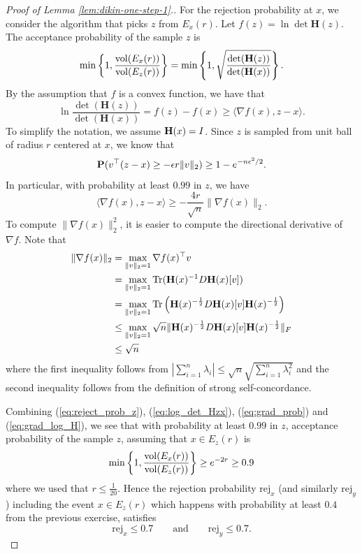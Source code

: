 \begin{proof}[Proof of Lemma \ref{lem:dikin-one-step-1}.]
For the rejection probability at $x$, we consider the algorithm that
picks $z$ from $E_{x}(r)$. Let $f(z)=\ln\det\mathbf{H}(z)$. The
acceptance probability of the sample $z$ is
\begin{equation}
\min\left\{ 1,\frac{\vol(E_{x}(r))}{\vol(E_{z}(r))}\right\} =\min\left\{ 1,\sqrt{\frac{\det(\mathbf{H}(z))}{\det(\mathbf{H}(x))}}\right\} .\label{eq:reject_prob_z}
\end{equation}
By the assumption that $f$ is a convex function, we have that
\begin{equation}
\ln\frac{\det(\mathbf{H}(z))}{\det(\mathbf{H}(x))}=f(z)-f(x)\geq\langle\nabla f(x),z-x\rangle.\label{eq:log_det_Hzx}
\end{equation}
To simplify the notation, we assume $\mh(x)=\mi$. Since $z$ is sampled
from unit ball of radius $r$ centered at $x$, we know that 
\[
\P(v^{\top}(z-x)\geq-\epsilon r\|v\|_{2})\geq1-e^{-n\epsilon^{2}/2}.
\]
In particular, with probability at least $0.99$ in $z$, we have
\begin{equation}
\langle\nabla f(x),z-x\rangle\geq-\frac{4r}{\sqrt{n}}\|\nabla f(x)\|_{2}.\label{eq:grad_prob}
\end{equation}
To compute $\|\nabla f(x)\|^{2}_{2}$, it is easier to compute the
directional derivative of $\nabla f$. Note that 
\begin{align}
\|\nabla f(x)\|_{2} & =\max_{\|v\|_{2}=1}\nabla f(x)^{\top}v\nonumber \\
 & =\max_{\|v\|_{2}=1}\tr(\mh(x)^{-1}D\mh(x)[v])\nonumber \\
 & =\max_{\|v\|_{2}=1}\tr\left(\mh(x)^{-\frac{1}{2}}D\mh(x)[v]\mh(x)^{-\frac{1}{2}}\right)\nonumber \\
 & \leq\max_{\|v\|_{2}=1}\sqrt{n}\|\mh(x)^{-\frac{1}{2}}D\mh(x)[v]\mh(x)^{-\frac{1}{2}}\|_{F}\nonumber \\
 & \leq\sqrt{n}\label{eq:grad_log_H}
\end{align}
where the first inequality follows from $\left|\sum^{n}_{i=1}\lambda_{i}\right|\leq\sqrt{n}\sqrt{\sum^{n}_{i=1}\lambda^{2}_{i}}$
and the second inequality follows from the definition of strong self-concordance.

Combining (\ref{eq:reject_prob_z}), (\ref{eq:log_det_Hzx}), (\ref{eq:grad_prob})
and (\ref{eq:grad_log_H}), we see that with probability at least
$0.99$ in $z$, acceptance probability of the sample $z$, assuming
that $x\in E_{z}(r)$ is 
\begin{equation}
\min\left\{ 1,\frac{\vol(E_{x}(r))}{\vol(E_{z}(r))}\right\} \geq e^{-2r}\geq0.9\label{eq:rejection}
\end{equation}
where we used that $r\le\frac{1}{20}$. Hence the rejection probability
$\mathrm{rej}_{x}$ (and similarly $\mathrm{rej}_{y}$) including
the event $x\in E_{z}(r)$ which happens with probability at least
$0.4$ from the previous exercise, satisfies
\begin{equation}
\mathrm{rej}_{x}\leq0.7\qquad\text{and}\qquad\mathrm{rej}_{y}\leq0.7.\label{eq:rej_xy}
\end{equation}


\end{proof}
